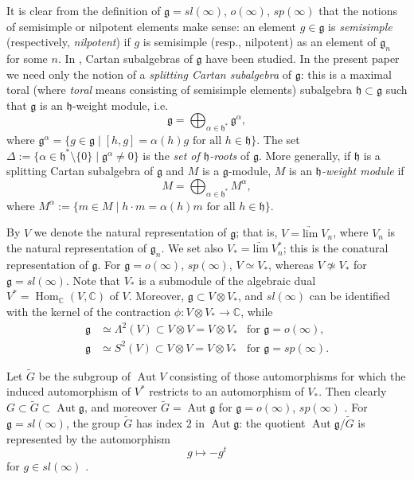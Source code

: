 \documentclass{amsart}
\renewcommand{\sl}{sl}
\newcommand{\so}{o}
\renewcommand{\sp}{sp}
\renewcommand{\gg}{\mathfrak{g}}
\newcommand{\hh}{\mathfrak{h}}
\newcommand{\CC}{\mathbb{C}}
\newcommand{\limarr}{\underrightarrow{\mathrm{lim}} \;}
\newcommand{\Aut}{\operatorname{Aut}}
\theoremstyle{definition}
\numberwithin{equation}{section}
\begin{document}
It is clear from the definition of $\gg = \sl(\infty)$, $\so(\infty)$, $\sp(\infty)$ that the notions of semisimple or nilpotent elements make sense: an element $g \in \gg$ is \emph{semisimple} (respectively, \emph{nilpotent}) if $g$ is semisimple (resp., nilpotent) as an element of $\gg_n$ for some $n$.  In \cite{NP, DPS}, Cartan subalgebras of $\gg$ have been studied.  In the present paper we need only the notion of a \emph{splitting Cartan subalgebra} of $\gg$: this is a maximal toral (where \emph{toral} means consisting of semisimple elements) subalgebra $\hh \subset \gg$ such that $\gg$ is an $\hh$-weight module, i.e.
$$\gg = \bigoplus_{\alpha \in \hh^*} \gg^\alpha,$$
where $\gg^\alpha = \{ g \in \gg \mid [h,g] = \alpha(h) g \textrm{ for all } h \in \hh \}$.  The set $\Delta := \{ \alpha \in \hh^* \setminus \{ 0 \} \mid \gg^\alpha \neq 0 \}$ is the \emph{set of $\hh$-roots} of $\gg$.  More generally, if $\hh$ is a splitting Cartan subalgebra of $\gg$ and $M$ is a $\gg$-module, $M$ is an \emph{$\hh$-weight module} if
$$M = \bigoplus_{\alpha \in \hh^*} M^\alpha,$$
where $M^\alpha := \{ m \in M \mid h \cdot m = \alpha(h)m \textrm{ for all } h \in \hh \}$.

By $V$ we denote the natural representation of $\gg$; that is, $V = \limarr V_n$, where $V_n$ is the natural representation of $\gg_n$.  We set also $V_* = \limarr V_n^*$; this is the conatural representation of $\gg$.  For $\gg = \so(\infty)$, $\sp(\infty)$, $V \simeq V_*$, whereas $V \not\simeq V_*$ for $\gg = \sl(\infty)$.  Note that $V_*$ is a submodule of the algebraic dual $V^* = \operatorname{Hom}_\CC (V, \CC)$ of $V$.  Moreover, $\gg \subset V \otimes V_*$, and $\sl(\infty)$ can be identified with the kernel of the contraction $\phi : V \otimes V_* \rightarrow \CC$, while
\begin{align*}
\gg & \simeq \Lambda^2 (V) \subset V \otimes V = V \otimes V_* & \textrm{for } \gg = \so(\infty), \\
\gg & \simeq S^2 (V) \subset V \otimes V = V \otimes V_* & \textrm{for } \gg = \sp(\infty).
\end{align*} 

Let $\tilde G$ be the subgroup of $\Aut V$ consisting of those
automorphisms for which the induced automorphism of $V^*$ restricts to
an automorphism of $V_*$.  Then clearly $G \subset \tilde{G} \subset
\Aut \gg$, and moreover $\tilde G = \Aut \gg$ for $\gg = \so(\infty)$,
$\sp(\infty)$ \cite[Corollary 1.6 (b)]{BBCM}.
For $\gg = \sl(\infty)$, the group $\tilde G$ has index $2$ in $\Aut \gg$: the quotient $\Aut \gg / \tilde G$ is represented by the automorphism
\begin{equation*}
g \mapsto -g^t
\end{equation*}
for $g \in \sl(\infty)$ \cite[Corollary 1.2 (a)]{BBCM}.
\end{document}
